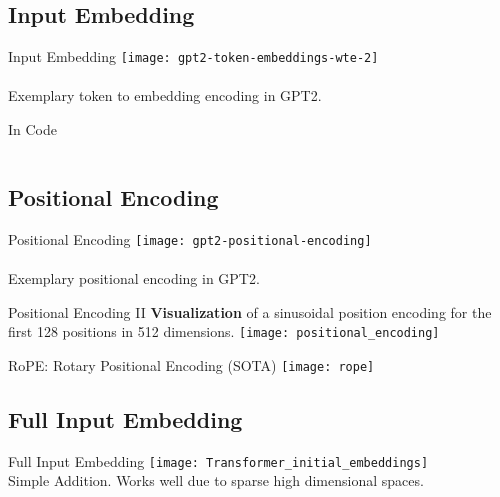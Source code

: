 \subsection{Input Embedding}
\begin{frame}[c]{Input Embedding}
    \texttt{[image: gpt2-token-embeddings-wte-2]} \\
     \\
    \large
    Exemplary token to embedding encoding in GPT2.
\end{frame}

\begin{frame}[c]{In Code}
    \inputminted{python}{code/embedding.py}
\end{frame}

\subsection{Positional Encoding}

\begin{frame}[c]{Positional Encoding}
    \texttt{[image: gpt2-positional-encoding]} \\
     \\
    \large
    Exemplary positional encoding in GPT2.
\end{frame}

\begin{frame}[c]{Positional Encoding II}
    \large
    \textbf{Visualization} of a sinusoidal position encoding for the first 128 positions in 512 dimensions.
    \newline
    \newline
    \texttt{[image: positional\_encoding]} \\
    \normalsize
\end{frame}

\begin{frame}[c]{RoPE: Rotary Positional Encoding (SOTA)}
    \texttt{[image: rope]} \\
\end{frame}


\subsection{Full Input Embedding}
\begin{frame}[c]{Full Input Embedding}
    \texttt{[image: Transformer\_initial\_embeddings]}
     \\
    \large
    Simple Addition. Works well due to sparse high dimensional spaces.
\end{frame}


